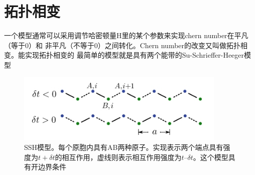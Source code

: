 \section{拓扑相变}
一个模型通常可以采用调节哈密顿量H里的某个参数来实现chern number在平凡（等于$0$）和
非平凡（不等于$0$）之间转化。Chern number的改变又叫做拓扑相变。能实现拓扑相变的
最简单的模型就是具有两个能带的Su-Schrieffer-Heeger模型
 \begin {figure}[tbp]
\centering 
\includegraphics[width=10cm]{./images/sshmodel.jpg} 
\caption{SSH模型。每个原胞内具有AB两种原子。实现表示两个端点具有强度为$t+\delta t$的相互作用，虚线则表示相互作用强度为$t – \delta t$。这个模型具有开边界条件\cite{topoText}}
\label{sshmodel}
\end {figure} 

